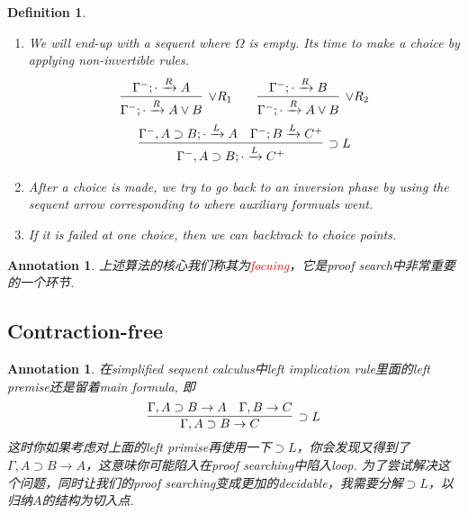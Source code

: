 \documentclass{article}
\theoremstyle{plain}
\newtheorem{definition}[theorem]{Definition}
\newtheorem{annotation}[theorem]{Annotation}
\theoremstyle{nonumberplain}
\newcommand{\redt}[1]{\textcolor{red}{#1}}
\begin{document}
\begin{definition}
\begin{enumerate}
\begin{enumerate}
		\item We will end-up with a sequent where $\Omega$ is empty. Its time to make a choice by applying non-invertible rules.
	$$
	\begin{gathered}
	\begin{aligned}
	\infer[\vee R_1]{\Gamma^-;\cdot \xrightarrow{R} A \vee B}{\Gamma^-;\cdot \xrightarrow{R} A} &&&& \infer[\vee R_2]{\Gamma^-;\cdot \xrightarrow{R} A \vee B}{\Gamma^-;\cdot \xrightarrow{R} B} 
	\end{aligned}\\
	\infer[\supset L]{\Gamma^-, A \supset B;\cdot \xrightarrow{L} C^+}{\Gamma^-, A \supset B;\cdot \xrightarrow{L} A & \Gamma^-;B \xrightarrow{L} C^+}	
	\end{gathered}
	$$
		\item After a choice is made, we try to go back to an inversion phase by using the sequent arrow corresponding to where auxiliary formuals went.
		\item If it is failed at one choice, then we can backtrack to choice points. 
	\end{enumerate}
\end{enumerate}
\end{definition}

\begin{annotation}
\rm 上述算法的核心我们称其为\redt{focuing}，它是proof search中非常重要的一个环节. 
\end{annotation}


\newpage
\subsection{Contraction-free}

\begin{annotation}
\rm 在simplified sequent calculus中left implication rule里面的left premise还是留着main formula, 即
$$
\infer[\supset L]{\Gamma, A \supset B \to C}{\Gamma, A \supset B \to A & \Gamma, B \to C}
$$
这时你如果考虑对上面的left primise再使用一下$\supset L$，你会发现又得到了$\Gamma, A \supset B \to A$，这意味你可能陷入在proof searching中陷入loop. 为了尝试解决这个问题，同时让我们的proof searching变成更加的decidable，我需要分解$\supset L$，以归纳$A$的结构为切入点.
\end{annotation}
\end{document}
